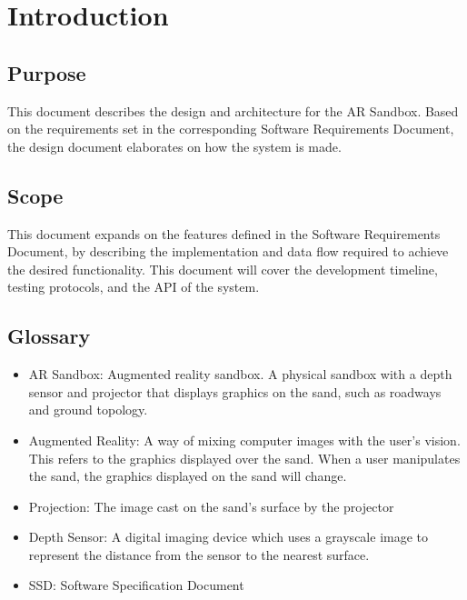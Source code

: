 \documentclass[onecolumn, draftclsnofoot,10pt, compsoc]{IEEEtran}
\begin{document}
\section{Introduction}

\subsection{Purpose}
This document describes the design and architecture for the AR Sandbox. Based on the requirements set in the corresponding Software Requirements Document, the design document elaborates on how the system is made.

\subsection{Scope}
This document expands on the features defined in the Software Requirements Document, by describing the implementation and data flow required to achieve the desired functionality. This document will cover the development timeline, testing protocols, and the API of the system.


\subsection{Glossary}
\begin{itemize}
\item AR Sandbox: Augmented reality sandbox. A physical sandbox with a depth sensor and projector that displays graphics on the sand, such as roadways and ground topology.
\item Augmented Reality: A way of mixing computer images with the user's vision. This refers to the graphics displayed over the sand. When a user manipulates the sand, the graphics displayed on the sand will change.
\item Projection: The image cast on the sand's surface by the projector
\item Depth Sensor: A digital imaging device which uses a grayscale image to represent the distance from the sensor to the nearest surface.
\item SSD: Software Specification Document
\end{itemize}
\end{document}
